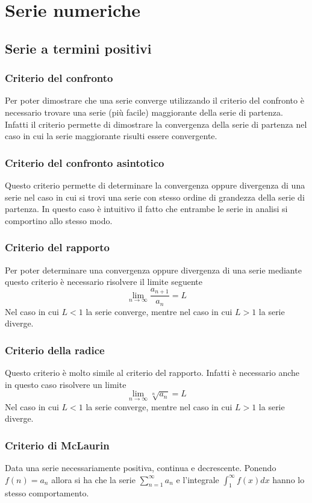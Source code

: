 \documentclass[10pt,a4paper]{report}
\begin{document}
\section*{Serie numeriche}
\subsection*{Serie a termini positivi}

\subsubsection{Criterio del confronto}
 Per poter dimostrare che una serie converge utilizzando il criterio del confronto è necessario trovare una serie (più facile) maggiorante della serie di partenza. Infatti il criterio permette di dimostrare la convergenza della serie di partenza nel caso in cui la serie maggiorante risulti essere convergente.
\subsubsection{Criterio del confronto asintotico}
Questo criterio permette di determinare la convergenza oppure divergenza di una serie nel caso in cui si trovi una serie con stesso ordine di grandezza della serie di partenza. In questo caso è intuitivo il fatto che entrambe le serie in analisi si comportino allo stesso modo.
\subsubsection{Criterio del rapporto}
Per poter determinare una convergenza oppure divergenza di una serie mediante questo criterio è necessario risolvere il limite seguente \[ \lim_{n \to \infty} \frac{a_{n+1}}{a_{n}} =L \] Nel caso in cui $ L < 1 $ la serie converge, mentre nel caso in cui $ L > 1 $ la serie diverge.
\subsubsection{Criterio della radice}
Questo criterio è molto simile al criterio del rapporto. Infatti è necessario anche in questo caso risolvere un limite \[ \lim_{n \to \infty} \sqrt[n]{a_{n}} = L \] Nel caso in cui $ L < 1 $ la serie converge, mentre nel caso in cui $ L > 1 $ la serie diverge.
\subsubsection{Criterio di McLaurin}
Data una serie necessariamente positiva, continua e decrescente. Ponendo $ f(n) = a_{n} $ allora si ha che la serie $ \sum_{n=1}^{\infty} a_{n} $ e l'integrale $ \int_{1}^{\infty} f(x)dx $ hanno lo stesso comportamento.
                
\end{document}
